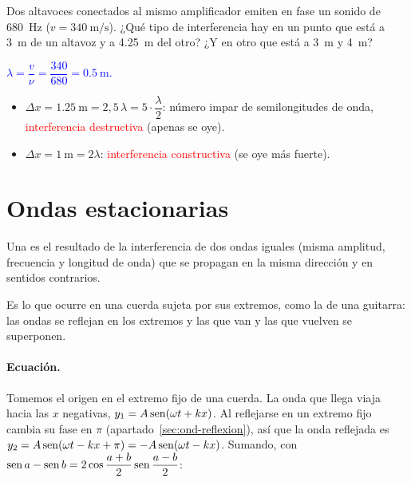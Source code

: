 \begin{exercise}
    Dos altavoces conectados al mismo amplificador emiten en fase un sonido de \qty{680}{\hertz}
    (\(v = \qty{340}{\m\per\second}\)). ¿Qué tipo de interferencia hay en un punto que está a \qty{3}{\m} de un altavoz y a
    \qty{4.25}{\m} del otro? ¿Y en otro que está a \qty{3}{\m} y \qty{4}{\m}?
    \begin{solu}
        \textcolor{blue}{\(\lambda = \dfrac{v}{\nu} = \dfrac{340}{680} = \qty{0.5}{\m}\).}
        \begin{itemize}
            \item \(\Delta x = \qty{1.25}{\m} = 2{,}5\,\lambda = 5\cdot\dfrac{\lambda}{2}\): número impar de semilongitudes de onda,
            \textcolor{red}{interferencia destructiva} (apenas se oye).
            \item \(\Delta x = \qty{1}{\m} = 2\lambda\): \textcolor{red}{interferencia constructiva} (se oye más fuerte).
        \end{itemize}
    \end{solu}
\end{exercise}

\section{Ondas estacionarias}\label{sec:ond-estacionarias}

\begin{definition}
    Una  es el resultado de la interferencia de dos ondas iguales (misma amplitud, frecuencia y
    longitud de onda) que se propagan en la misma dirección y en sentidos contrarios.
\end{definition}

Es lo que ocurre en una cuerda sujeta por sus extremos, como la de una guitarra: las ondas se reflejan en los extremos y
las que van y las que vuelven se superponen.

\paragraph{Ecuación.} Tomemos el origen en el extremo fijo de una cuerda. La onda que llega viaja hacia las \(x\) negativas,
\(y_1 = A\operatorname{sen}(\omega t + kx)\). Al reflejarse en un extremo fijo cambia su fase en \(\pi\) (apartado~\ref{sec:ond-reflexion}),
así que la onda reflejada es \(y_2 = A\operatorname{sen}(\omega t - kx + \pi) = -A\operatorname{sen}(\omega t - kx)\). Sumando, con
\(\operatorname{sen} a - \operatorname{sen} b = 2\cos\dfrac{a + b}{2}\operatorname{sen}\dfrac{a - b}{2}\):
\begin{centeredequation}
     \label{eq:ond-estacionaria}
\end{centeredequation}

